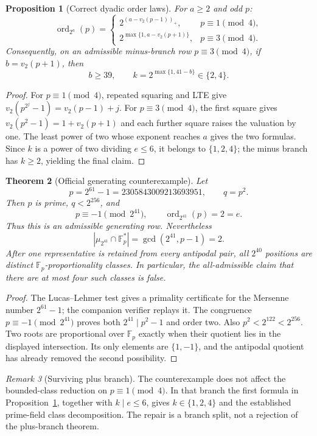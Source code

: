 \documentclass[11pt,a4paper]{amsart}
\newtheorem{theorem}{Theorem}[section]
\newtheorem{proposition}[theorem]{Proposition}
\theoremstyle{remark}
\newtheorem{remark}[theorem]{Remark}
\newcommand{\F}{\mathbb F}
\newcommand{\ord}{\operatorname{ord}}
\begin{document}
\begin{proposition}[Correct dyadic order laws]\label{prop:order}
For $a\ge2$ and odd $p$:
\[
 \ord_{2^a}(p)=
 \begin{cases}
  2^{(a-v_2(p-1))_+},&p\equiv1\pmod4,\\[2mm]
  2^{\max\{1,a-v_2(p+1)\}},&p\equiv3\pmod4.
 \end{cases}
\]
Consequently, on an admissible minus-branch row
$p\equiv3\pmod4$, if $b=v_2(p+1)$, then
\[
 b\ge39,
 \qquad
 k=2^{\max\{1,41-b\}}\in\{2,4\}.
\]
\end{proposition}

\begin{proof}
For $p\equiv1\pmod4$, repeated squaring and LTE give
$v_2(p^{2^j}-1)=v_2(p-1)+j$.  For $p\equiv3\pmod4$, the first square gives
$v_2(p^2-1)=1+v_2(p+1)$ and each further square raises the valuation by one.
The least power of two whose exponent reaches $a$ gives the two formulas.
Since $k$ is a power of two dividing $e\le6$, it belongs to
$\{1,2,4\}$; the minus branch has $k\ge2$, yielding the final claim.
\end{proof}

\begin{theorem}[Official generating counterexample]\label{thm:m61}
Let
\[
 p=2^{61}-1=2305843009213693951,
 \qquad q=p^2.
\]
Then $p$ is prime, $q<2^{256}$, and
\[
 p\equiv-1\pmod{2^{41}},
 \qquad
 \ord_{2^{41}}(p)=2=e.
\]
Thus this is an admissible generating row.  Nevertheless
\[
 \left|\mu_{2^{41}}\cap\F_p^*\right|
 =\gcd(2^{41},p-1)=2.
\]
After one representative is retained from every antipodal pair, all
$2^{40}$ positions are distinct $\F_p$-proportionality classes.  In
particular, the all-admissible claim that there are at most four such classes
is false.
\end{theorem}

\begin{proof}
The Lucas--Lehmer test gives a primality certificate for the Mersenne number
$2^{61}-1$; the companion verifier replays it.  The congruence
$p\equiv-1\pmod{2^{41}}$ proves both $2^{41}\mid p^2-1$ and order two.
Also $p^2<2^{122}<2^{256}$.  Two roots are proportional over $\F_p$ exactly
when their quotient lies in the displayed intersection.  Its only elements
are $\{1,-1\}$, and the antipodal quotient has already removed the second
possibility.
\end{proof}

\begin{remark}[Surviving plus branch]
The counterexample does not affect the bounded-class reduction on
$p\equiv1\pmod4$.  In that branch the first formula in
Proposition~\ref{prop:order}, together with $k\mid e\le6$, gives
$k\in\{1,2,4\}$ and the established prime-field class decomposition.  The
repair is a branch split, not a rejection of the plus-branch theorem.
\end{remark}
\end{document}
